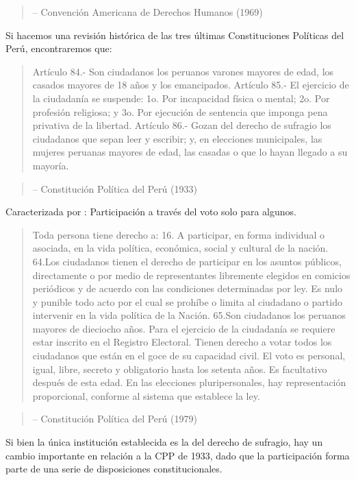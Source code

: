 \documentclass[
]{book}
\begin{document}
\begin{quote}
-- Convención Americana de Derechos Humanos (1969)
\end{quote}

Si hacemos una revisión histórica de las tres últimas Constituciones Políticas del Perú, encontraremos que:

\begin{quote}
Artículo 84.- Son ciudadanos los peruanos varones mayores de edad, los casados mayores de 18 años y los emancipados.
Artículo 85.- El ejercicio de la ciudadanía se suspende:
1o. Por incapacidad física o mental; 2o. Por profesión religiosa; y 3o. Por ejecución de sentencia que imponga pena privativa de la libertad.
Artículo 86.- Gozan del derecho de sufragio los ciudadanos que sepan leer y escribir; y, en elecciones municipales, las mujeres peruanas mayores de edad, las casadas o que lo hayan llegado a su mayoría.
\end{quote}

\begin{quote}
-- Constitución Política del Perú (1933)
\end{quote}

Caracterizada por : Participación a través del voto solo para algunos.

\begin{quote}
Toda persona tiene derecho a:
16. A participar, en forma individual o asociada, en la vida política, económica, social y cultural de la nación.
64.Los ciudadanos tienen el derecho de participar en los asuntos públicos, directamente o por medio de representantes libremente elegidos en comicios periódicos y de acuerdo con las condiciones determinadas por ley. Es nulo y punible todo acto por el cual se prohíbe o limita al ciudadano o partido intervenir en la vida política de la Nación.
65.­Son ciudadanos los peruanos mayores de dieciocho años. Para el ejercicio de la ciudadanía se requiere estar inscrito en el Registro Electoral. Tienen derecho a votar todos los ciudadanos que están en el goce de su capacidad civil. El voto es personal, igual, libre, secreto y obligatorio hasta los setenta años. Es facultativo después de esta edad. En las elecciones pluripersonales, hay representación proporcional, conforme al sistema que establece la ley.
\end{quote}

\begin{quote}
-- Constitución Política del Perú (1979)
\end{quote}

Si bien la única institución establecida es la del derecho de sufragio, hay un cambio importante en relación a la CPP de 1933, dado que la participación forma parte de una serie de disposiciones constitucionales.
\end{document}
